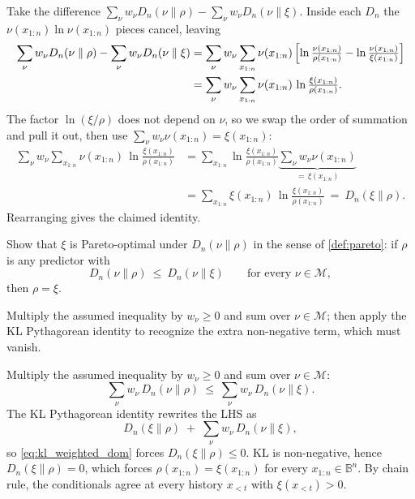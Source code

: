 \documentclass[fontsize=11pt, parskip=half]{scrartcl}
\newcommand{\Mc}{\mathcal{M}}
\begin{document}
\begin{solution}
Take the difference $\sum_\nu w_\nu D_n(\nu \parallel \rho) - \sum_\nu w_\nu D_n(\nu \parallel \xi)$.
Inside each $D_n$ the $\nu(x_{1:n}) \ln \nu(x_{1:n})$ pieces cancel, leaving
\begin{align*}
\sum_\nu w_\nu D_n(\nu \parallel \rho) - \sum_\nu w_\nu D_n(\nu \parallel \xi)
&= \sum_\nu w_\nu \sum_{x_{1:n}}
   \nu(x_{1:n})\,\Bigl[\ln\tfrac{\nu(x_{1:n})}{\rho(x_{1:n})}
                  - \ln\tfrac{\nu(x_{1:n})}{\xi(x_{1:n})}\Bigr] \\
&= \sum_\nu w_\nu \sum_{x_{1:n}}
   \nu(x_{1:n})\,\ln \tfrac{\xi(x_{1:n})}{\rho(x_{1:n})}.
\end{align*}
The factor $\ln(\xi/\rho)$ does not depend on $\nu$, so we swap the order of
summation and pull it out, then use $\sum_\nu w_\nu \nu(x_{1:n}) = \xi(x_{1:n})$:
\begin{align*}
\sum_\nu w_\nu \sum_{x_{1:n}}
   \nu(x_{1:n})\,\ln \tfrac{\xi(x_{1:n})}{\rho(x_{1:n})}
&= \sum_{x_{1:n}} \ln \tfrac{\xi(x_{1:n})}{\rho(x_{1:n})}
   \underbrace{\sum_\nu w_\nu \nu(x_{1:n})}_{=\, \xi(x_{1:n})} \\
&= \sum_{x_{1:n}} \xi(x_{1:n}) \,\ln \tfrac{\xi(x_{1:n})}{\rho(x_{1:n})}
~=~ D_n(\xi \parallel \rho).
\end{align*}
Rearranging gives the claimed identity. \qedhere
\end{solution}

\begin{exercise}
\label{prob:kl_pareto}



Show that $\xi$ is Pareto-optimal under $D_n(\nu \parallel \rho)$ in the sense of \cref{def:pareto}: if $\rho$ is any predictor with
\[
  D_n(\nu \parallel \rho) ~\leq~ D_n(\nu \parallel \xi) \qquad \text{for every } \nu \in \Mc,
\]
then $\rho = \xi$.

\begin{hint}
Multiply the assumed inequality by $w_\nu \geq 0$ and sum over
$\nu \in \Mc$; then apply the KL Pythagorean identity to recognize the extra
non-negative term, which must vanish.
\end{hint}
\end{exercise}

\begin{solution}
Multiply the assumed inequality by $w_\nu \geq 0$ and sum over $\nu \in \Mc$:
\begin{equation}\label{eq:kl_weighted_dom}
  \sum_\nu w_\nu\, D_n(\nu \parallel \rho) ~\leq~ \sum_\nu w_\nu\, D_n(\nu \parallel \xi).
\end{equation}
The KL Pythagorean identity rewrites the LHS as
\[
  D_n(\xi \parallel \rho) \;+\; \sum_\nu w_\nu\, D_n(\nu \parallel \xi),
\]
so \cref{eq:kl_weighted_dom} forces $D_n(\xi \parallel \rho) \leq 0$. KL is non-negative, hence $D_n(\xi \parallel \rho) = 0$, which forces $\rho(x_{1:n}) = \xi(x_{1:n})$ for every $x_{1:n} \in \mathbb{B}^n$. By chain rule, the conditionals agree at every history $x_{<t}$ with $\xi(x_{<t}) > 0$. \qedhere
\end{solution}
\end{document}
